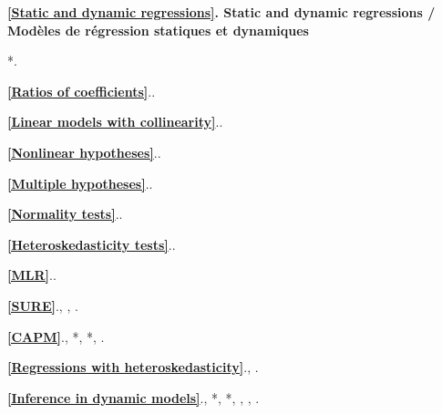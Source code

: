 \documentclass[titlepage,11pt,amstex]{article}
\begin{document}
\quad

\noindent \textbf{\ref{Static and dynamic regressions}. Static and dynamic
regressions / Mod\`{e}les de r\'{e}gression statiques et dynamiques}

\quad

\begin{description}
\item[\quad ] *\cite[Chapter 5 and 6]{Ullah(2004)}.

\item \textbf{\ref{Ratios of coefficients}}.\quad *\cite{Dufour(1997)}.

\item[\quad ] \textbf{\ref{Linear models with collinearity}}.\quad *\cite%
{Dufour(1982)}.

\item[\quad ] \textbf{\ref{Nonlinear hypotheses}}.\quad *\cite{Dufour(1989)}.

\item[\quad ] \textbf{\ref{Multiple hypotheses}}.\quad *\cite{Dufour(1989)}.

\item[\quad ] \textbf{\ref{Normality tests}}.\quad \cite%
{Dufour-Farhat-Gardiol-Khalaf(1998)}.

\item[\quad ] \textbf{\ref{Heteroskedasticity tests}}.\quad \cite%
{Dufour-Khalaf-Bernard-Genest(2004)}.

\item[\quad ] \textbf{\ref{MLR}}.\quad \cite{Dufour-Khalaf(2002b)}.

\item[\quad ] \textbf{\ref{SURE}}.\quad \cite{Dufour-Khalaf(2002)}, \cite%
{Dufour-Khalaf(2001d)}, \cite{Dufour-Torres(1998)}.

\item \textbf{\ref{CAPM}}.\quad *\cite{Dufour-Khalaf-Beaulieu(2003)}, *\cite%
{Beaulieu-Dufour-Khalaf(2006)}, *\cite{Beaulieu-Dufour-Khalaf(2007)}, .

\item[\quad ] \textbf{\ref{Regressions with heteroskedasticity}}.\quad \cite%
{Dufour(1991)}, \cite{Dufour-Mahseredjian(1993)}.

\item[\quad ] \textbf{\ref{Inference in dynamic models}}.\quad \cite%
{Dufour(1990)}, *\cite{Dufour-King(1991)}, *\cite{Dufour-Kiviet(1998)}, \cite%
{Kiviet-Dufour(1997)}, \cite{Dufour-Torres(1998)}, \cite{Dufour-Torres(2000)}%
.
\end{description}
\end{document}
